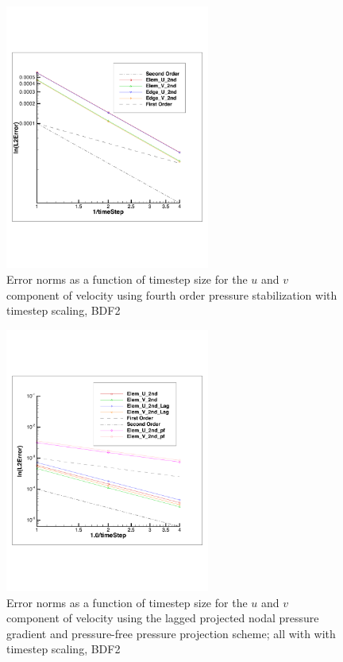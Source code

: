 \begin{figure}
\centerline{\includegraphics[width=0.6\textwidth]{figures/convTaylorVortexSO.pdf}}
\caption{Error norms as a function of timestep size for the $u$ and $v$
component of velocity using fourth order pressure stabilization with timestep scaling, BDF2}
\label{fig:so4thTstep}
\end{figure}

\begin{figure}
\centerline{\includegraphics[width=0.6\textwidth]{figures/convTaylorVortexSO_ElemLagElemPf.pdf}}
\caption{Error norms as a function of timestep size for the $u$ and $v$
component of velocity using the lagged projected nodal pressure gradient and pressure-free pressure projection scheme; all with with timestep scaling, BDF2}
\label{fig:hybridTstep}
\end{figure}

